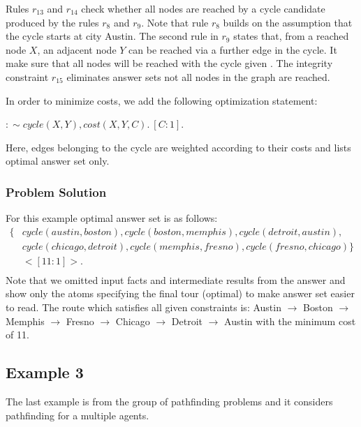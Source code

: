 \documentclass[a4paper, titlepage]{article}
\begin{document}
Rules $r_{13}$ and $r_{14}$ check whether all 
nodes 
are reached by a cycle candidate produced by the rules 
$r_8$ and $r_9$.  Note that rule $r_8$ builds on the
assumption that the cycle starts at city Austin. The second 
rule in $r_9$ states that, from a reached node $X$, an 
adjacent node $Y$ can be reached via a further edge in the 
cycle. It make sure that all nodes will be reached with the 
cycle given \cite{gkklorst2015}. The integrity constraint $r_{15}$ 
eliminates answer sets not all nodes in the graph are reached.

In order to minimize costs, we add the following 
optimization statement: \\
\centerline{$:\sim cycle(X,Y), cost(X,Y,C). \  [C:1].$}
Here, edges belonging to the cycle are weighted according 
to their costs and \dlvhex{} lists optimal answer set only.

\subsubsection{Problem Solution}
For this example optimal answer set 
is as follows:
\begin{align*}
\{&  cycle(austin,boston), 
cycle(boston,memphis),cycle(detroit,austin), \\
& cycle(chicago,detroit), 
cycle(memphis,fresno),cycle(fresno,chicago) \} \\
& <[11:1]>. \\
\end{align*}
Note that we omitted input facts and intermediate results from the answer and show only the atoms specifying the final tour (optimal) to make 
answer set easier to read. The route which satisfies all given constraints is: Austin $\rightarrow$ Boston $\rightarrow$ Memphis $\rightarrow$ Fresno $\rightarrow$ Chicago $\rightarrow$ Detroit $\rightarrow$ Austin with the minimum cost of 11. 




\subsection{Example 3}
\label{example3}
The last example is from the group of pathfinding problems and it considers pathfinding for a multiple agents.
 
\end{document}
